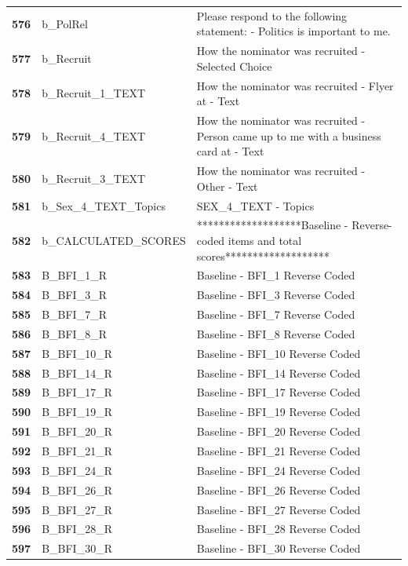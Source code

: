 \documentclass[
  letterpaper,
  DIV=11,
  numbers=noendperiod]{scrartcl}
\begin{document}
\begin{longtable}[t]{>{}cll}
\addlinespace
\textbf{576} & b\_PolRel & Please respond to the following statement: - Politics is important to me.\\
\textbf{577} & b\_Recruit & How the nominator was recruited - Selected Choice\\
\textbf{578} & b\_Recruit\_1\_TEXT & How the nominator was recruited - Flyer at - Text\\
\textbf{579} & b\_Recruit\_4\_TEXT & How the nominator was recruited - Person came up to me with a business card at - Text\\
\textbf{580} & b\_Recruit\_3\_TEXT & How the nominator was recruited - Other - Text\\
\addlinespace
\textbf{581} & b\_Sex\_4\_TEXT\_Topics & SEX\_4\_TEXT - Topics\\
\textbf{582} & b\_CALCULATED\_SCORES & *******************Baseline - Reverse-coded items and total scores*******************\\
\textbf{583} & B\_BFI\_1\_R & Baseline - BFI\_1 Reverse Coded\\
\textbf{584} & B\_BFI\_3\_R & Baseline - BFI\_3 Reverse Coded\\
\textbf{585} & B\_BFI\_7\_R & Baseline - BFI\_7 Reverse Coded\\
\addlinespace
\textbf{586} & B\_BFI\_8\_R & Baseline - BFI\_8 Reverse Coded\\
\textbf{587} & B\_BFI\_10\_R & Baseline - BFI\_10 Reverse Coded\\
\textbf{588} & B\_BFI\_14\_R & Baseline - BFI\_14 Reverse Coded\\
\textbf{589} & B\_BFI\_17\_R & Baseline - BFI\_17 Reverse Coded\\
\textbf{590} & B\_BFI\_19\_R & Baseline - BFI\_19 Reverse Coded\\
\addlinespace
\textbf{591} & B\_BFI\_20\_R & Baseline - BFI\_20 Reverse Coded\\
\textbf{592} & B\_BFI\_21\_R & Baseline - BFI\_21 Reverse Coded\\
\textbf{593} & B\_BFI\_24\_R & Baseline - BFI\_24 Reverse Coded\\
\textbf{594} & B\_BFI\_26\_R & Baseline - BFI\_26 Reverse Coded\\
\textbf{595} & B\_BFI\_27\_R & Baseline - BFI\_27 Reverse Coded\\
\addlinespace
\textbf{596} & B\_BFI\_28\_R & Baseline - BFI\_28 Reverse Coded\\
\textbf{597} & B\_BFI\_30\_R & Baseline - BFI\_30 Reverse Coded\\

\end{longtable}
\end{document}
